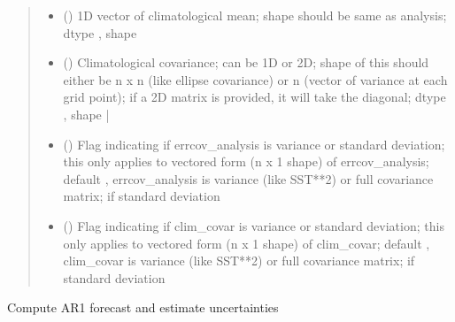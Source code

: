 \documentclass[letterpaper,10pt,english]{sphinxmanual}
\begin{document}
\begin{fulllineitems}
\begin{quote}
\begin{description}
\begin{itemize}
\item {}
\sphinxAtStartPar
{} () \textendash{} 1D vector of climatological mean;
shape should be same as analysis;
dtype , shape 

\item {}
\sphinxAtStartPar
{} () \textendash{} Climatological covariance;
can be 1D or 2D;
shape of this should either be n x n (like ellipse covariance)
or n (vector of variance at each grid point);
if a 2D matrix is provided, it will take the diagonal;
dtype , shape  | 

\item {}
\sphinxAtStartPar
{} () \textendash{} Flag indicating if errcov\_analysis is
variance or standard deviation;
this only applies to vectored form (n x 1 shape) of errcov\_analysis;
default , errcov\_analysis is variance (like SST**2) or
full covariance matrix;
 if standard deviation

\item {}
\sphinxAtStartPar
{} () \textendash{} Flag indicating if clim\_covar is variance or standard deviation;
this only applies to vectored form (n x 1 shape) of clim\_covar;
default , clim\_covar is variance (like SST**2) or
full covariance matrix;
 if standard deviation

\end{itemize}

\end{description}\end{quote}

\begin{fulllineitems}
\label{\detokenize{kalman:glomar_gridding.autoregressive_kalman.Autoregressive1ForecastUncorr.predict}}
\pysigstartsignatures
\pysiglinewithargsret
{}
{}
{}
\pysigstopsignatures
\sphinxAtStartPar
Compute AR1 forecast and estimate uncertainties


\end{fulllineitems}
\end{fulllineitems}
\end{document}
